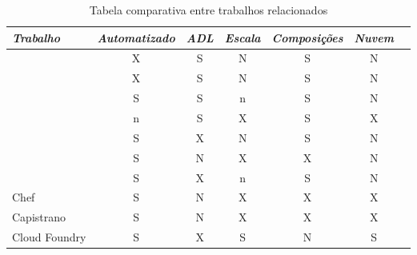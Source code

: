 
\begin{table}[!t]
\begin{center}
    \begin{tabular}{l c c c c c c}
	 \hline
	 \itshape{Trabalho} & \itshape{Automatizado} & \itshape{ADL} & \itshape{Escala} & \itshape{Composições} & \itshape{Nuvem}  \\ \hline
    \cite{Magee1994Regis, Magee1996Dynamic} & X & S & N & S & N \\
    \cite{Balter1998Olan}   & X & S & N & S & N \\
    \cite{quema2004hierarchical}  & S & S & n & S & N \\
    \cite{akkerman2005j2ee}   & n & S & X & S & X \\
    \cite{Lacour2004Corba} & S & X & N & S & N \\
    \cite{Dolstra2005Configuration}   & S & N & X & X & N \\
    \cite{Watson2006Dynasoar}   & S & X & n & S & N \\
    Chef   & S & N & X & X & X \\
    Capistrano   & S & N & X & X & X \\
    Cloud Foundry   & S & X & S & N & S \\

    \end{tabular}
  \caption{Tabela comparativa entre trabalhos relacionados}
  \label{tab:relacionados}
\end{center}
\end{table}




